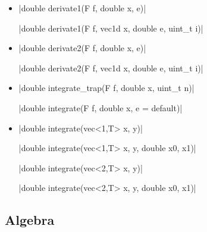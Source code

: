 \documentclass[12pt]{report}
\begin{document}
\begin{itemize}
\item \cppinline|double derivate1(F f, double x, e)| 

\cppinline|double derivate1(F f, vec1d x, double e, uint_t i)| 

\item \cppinline|double derivate2(F f, double x, e)| 

\cppinline|double derivate2(F f, vec1d x, double e, uint_t i)| 

\item \cppinline|double integrate_trap(F f, double x, uint_t n)| 

\cppinline|double integrate(F f, double x, e = default)| 

\item \cppinline|double integrate(vec<1,T> x, y)| 

\cppinline|double integrate(vec<1,T> x, y, double x0, x1)|

\cppinline|double integrate(vec<2,T> x, y)|

\cppinline|double integrate(vec<2,T> x, y, double x0, x1)|

\end{itemize}

\subsection{Algebra}
\end{document}
